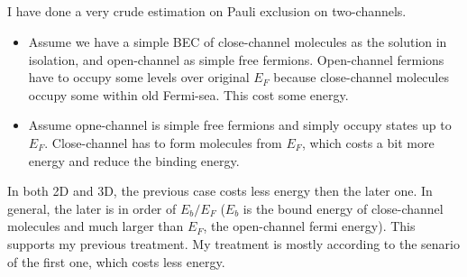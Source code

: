\subsection{}
I have done a very crude estimation on Pauli exclusion on two-channels.  

\begin{itemize}
	\item Assume we have a simple BEC of close-channel molecules as the solution in isolation, and open-channel as simple free fermions.  Open-channel fermions have to occupy some levels over original $E_F$ because close-channel molecules occupy some within old Fermi-sea. This cost some energy. 
	\item Assume opne-channel is simple free fermions and simply occupy states up to $E_F$. Close-channel has to form molecules from $E_F$, which costs a bit more energy and reduce the binding energy.  
\end{itemize}
In both 2D and 3D, the previous case costs less energy then the later one.  In general, the later is in order of $E_b/E_F$ ($E_b$ is the bound energy of close-channel molecules and much larger than $E_F$, the open-channel fermi energy).  This supports my previous treatment.  My treatment is mostly according to the senario of the first one, which costs less energy. 